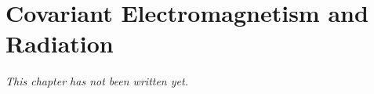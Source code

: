 \chapter{Covariant Electromagnetism and Radiation}\label{ch:b3:covariant-electromagnetism}


\emph{This chapter has not been written yet.}
